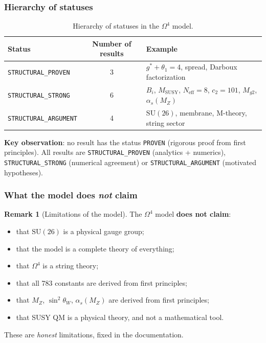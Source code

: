 \documentclass[11pt,a4paper]{article}
\newcommand{\SU}{\ensuremath{\mathrm{SU}}}
\newcommand{\Om}{\ensuremath{\Omega^4}}
\theoremstyle{definition}
\newtheorem{remark}[theorem]{Remark}
\begin{document}
\subsubsection{Hierarchy of statuses}

\begin{table}[ht]
\centering
\caption{Hierarchy of statuses in the \texorpdfstring{$\Om$}{} model.}
\label{tab:conclusions-status-levels}
\begin{tabular}{lcp{5cm}}
\toprule
Status & Number of results & Example \\
\midrule
\texttt{STRUCTURAL\_PROVEN} & 3 &
    $g^* + \theta_1 = 4$, spread, Darboux factorization \\[0.3em]
\texttt{STRUCTURAL\_STRONG} & 6 &
    $B_i$, $M_{\text{SUSY}}$, $N_{\text{eff}} = 8$, $c_2 = 101$,
    $M_{g2}$, $\alpha_s(M_Z)$ \\[0.3em]
\texttt{STRUCTURAL\_ARGUMENT} & 4 &
    $\SU(26)$, membrane, M-theory, string sector \\
\bottomrule
\end{tabular}
\end{table}

\medskip\noindent
\textbf{Key observation}: no result has the
status \texttt{PROVEN} (rigorous proof from first
principles). All results are \texttt{STRUCTURAL\_PROVEN}
(analytics + numerics), \texttt{STRUCTURAL\_STRONG}
(numerical agreement) or \texttt{STRUCTURAL\_ARGUMENT}
(motivated hypotheses).

\subsubsection{What the model does \emph{not} claim}

\begin{remark}[Limitations of the model]
\label{rem:conclusions-limitations}
The $\Om$ model \textbf{does not claim}:
\begin{itemize}
    \item that $\SU(26)$ is a physical gauge group;
    \item that the model is a complete theory of everything;
    \item that $\Om$ is a string theory;
    \item that all 783 constants are derived from first principles;
    \item that $M_Z$, $\sin^2\theta_W$, $\alpha_s(M_Z)$
          are derived from first principles;
    \item that SUSY QM is a physical theory, and not
          a mathematical tool.
\end{itemize}
These are \emph{honest} limitations, fixed in the
documentation.
\end{remark}
\end{document}
